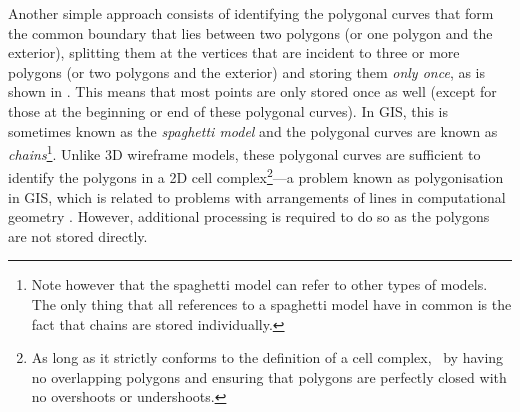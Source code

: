 Another simple approach consists of identifying the polygonal curves that form the common boundary that lies between two polygons (or one polygon and the exterior), splitting them at the vertices that are incident to three or more polygons (or two polygons and the exterior) and storing them \emph{only once}, as is shown in .
This means that most points are only stored once as well (except for those at the beginning or end of these polygonal curves).
In GIS, this is sometimes known as the \emph{spaghetti model} and the polygonal curves are known as \emph{chains}\footnote{Note however that the spaghetti model can refer to other types of models. The only thing that all references to a spaghetti model have in common is the fact that chains are stored individually.}.
Unlike 3D wireframe models, these polygonal curves are sufficient to identify the polygons in a 2D cell complex\footnote{As long as it strictly conforms to the definition of a cell complex, \eg\ by having no overlapping polygons and ensuring that polygons are perfectly closed with no overshoots or undershoots.}---a problem known as polygonisation in GIS, which is related to problems with arrangements of lines in computational geometry \citep[Ch.~8]{deBerg08}.
However, additional processing is required to do so as the polygons are not stored directly.

